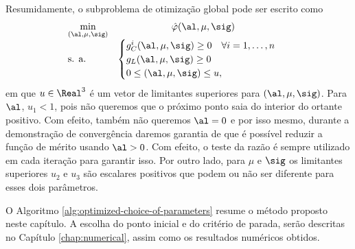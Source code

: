 Resumidamente, o subproblema de otimização global pode ser escrito como
\begin{equation}
	\begin{array}{lc}
\displaystyle \min_{(\al,\mu,\sig)} & \hat\varphi(\al,\mu,\sig) \\
\text{s. a.} &\begin{cases} g_C^i(\al,\mu,\sig) \geq 0 \quad \forall i = 1,\ldots,n \\
				g_L(\al,\mu,\sig)   \geq 0 	\\
				 0\leq (\al,\mu,\sig) \leq u,
				 	
				 \end{cases}\
\end{array}
\label{eq:pop-subproblem}
\end{equation}
em que   $u\in\Real^3$ é um vetor de limitantes superiores para  $(\al,\mu,\sig)$. Para
$\al$, $u_1<1$, pois  não queremos que o próximo ponto saia do interior do ortante positivo. Com efeito, também não queremos $\al=0$ e por isso mesmo,  durante a
demonstração de convergência daremos garantia de que é possível reduzir a
função de mérito usando $\al>0$. Com efeito, o teste da razão é sempre utilizado em cada iteração para garantir isso.
Por outro lado, para $\mu$ e $\sig$ os limitantes superiores $u_{2}$ e $u_{3}$ são escalares positivos que podem ou não ser diferente para esses dois parâmetros.

 
O Algoritmo \ref{alg:optimized-choice-of-parameters} resume o método proposto neste capítulo. A escolha do ponto inicial e do critério de parada, serão descritas no Capítulo \ref{chap:numerical}, assim como os resultados numéricos obtidos.

